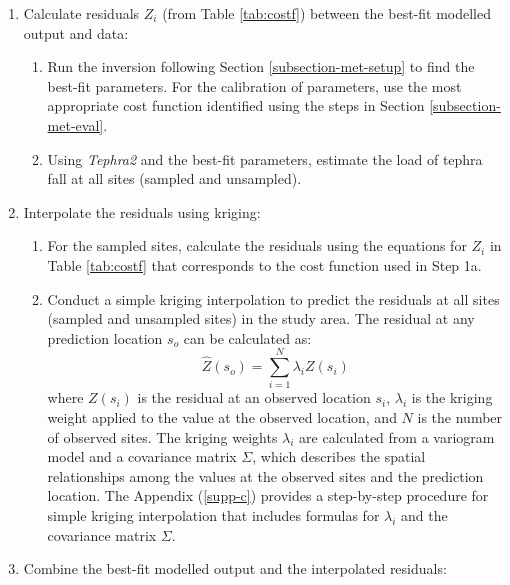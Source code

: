 \documentclass[a4paper,fleqn]{cas-sc}
\begin{document}
\begin{enumerate}

    \item 
    Calculate residuals $Z_{i}$ (from Table \ref{tab:costf}) between the best-fit modelled output and data:
    
    \begin{enumerate}
        \item
        Run the inversion following Section \ref{subsection-met-setup} to find the best-fit parameters. For the calibration of parameters, use the most appropriate cost function identified using the steps in Section \ref{subsection-met-eval}.
    
        \item 
        Using \textit{Tephra2} and the best-fit parameters, estimate the load of tephra fall at all sites (sampled and unsampled).
    \end{enumerate}

    \item 
    Interpolate the residuals using kriging:
    
    \begin{enumerate}
    \item
    For the sampled sites, calculate the residuals using the equations for $Z_{i}$ in Table \ref{tab:costf} that corresponds to the cost function used in Step 1a.
    
    \item 
    Conduct a simple kriging interpolation to predict the residuals at all sites (sampled and unsampled sites) in the study area. The residual at any prediction location $s_{o}$ can be calculated as:
    \begin{equation} \label{eq:simpkrigz}
    \hat{Z}(s_{o}) = \sum_{i=1}^{N} \lambda_{i} Z(s_{i}) 
    \end{equation} 
    where $Z(s_{i})$ is the residual at an observed location $s_{i}$, $\lambda_{i}$ is the kriging weight applied to the value at the observed location, and $N$ is the number of observed sites. The kriging weights $\lambda_{i}$ are calculated from a variogram model and a covariance matrix $\Sigma$, which describes the spatial relationships among the values at the observed sites and the prediction location. The Appendix (\ref{supp-c}) provides a step-by-step procedure for simple kriging interpolation that includes formulas for $\lambda_{i}$ and the covariance matrix $\Sigma$.
    \end{enumerate}
    
    \item 
    Combine the best-fit modelled output and the interpolated residuals:
    

\end{enumerate}
\end{document}
